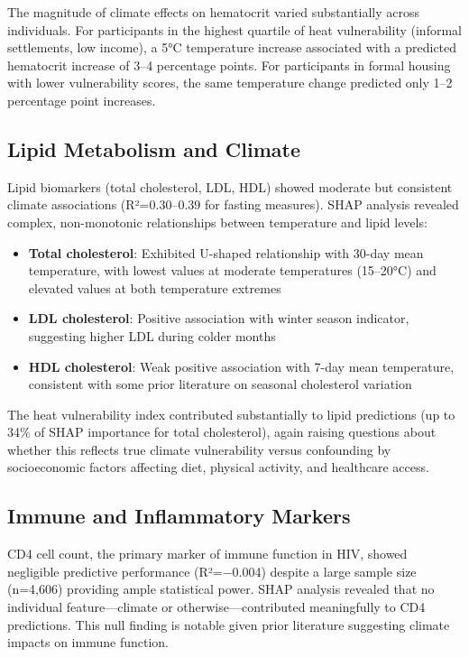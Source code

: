 The magnitude of climate effects on hematocrit varied substantially across individuals. For participants in the highest quartile of heat vulnerability (informal settlements, low income), a 5°C temperature increase associated with a predicted hematocrit increase of 3--4 percentage points. For participants in formal housing with lower vulnerability scores, the same temperature change predicted only 1--2 percentage point increases.

\subsection{Lipid Metabolism and Climate}

Lipid biomarkers (total cholesterol, LDL, HDL) showed moderate but consistent climate associations (R²=0.30--0.39 for fasting measures). SHAP analysis revealed complex, non-monotonic relationships between temperature and lipid levels:

\begin{itemize}
    \item \textbf{Total cholesterol}: Exhibited U-shaped relationship with 30-day mean temperature, with lowest values at moderate temperatures (15--20°C) and elevated values at both temperature extremes
    \item \textbf{LDL cholesterol}: Positive association with winter season indicator, suggesting higher LDL during colder months
    \item \textbf{HDL cholesterol}: Weak positive association with 7-day mean temperature, consistent with some prior literature on seasonal cholesterol variation
\end{itemize}

The heat vulnerability index contributed substantially to lipid predictions (up to 34\% of SHAP importance for total cholesterol), again raising questions about whether this reflects true climate vulnerability versus confounding by socioeconomic factors affecting diet, physical activity, and healthcare access.

\subsection{Immune and Inflammatory Markers}

CD4 cell count, the primary marker of immune function in HIV, showed negligible predictive performance (R²=−0.004) despite a large sample size (n=4,606) providing ample statistical power. SHAP analysis revealed that no individual feature---climate or otherwise---contributed meaningfully to CD4 predictions. This null finding is notable given prior literature suggesting climate impacts on immune function.


